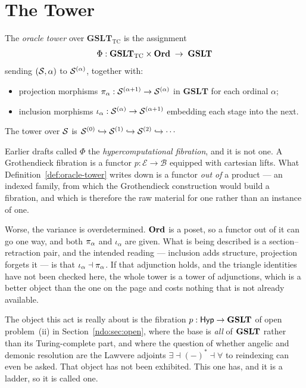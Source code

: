 \section{The Tower}

\begin{definition}
\label{def:oracle-tower}
The \emph{oracle tower} over $\mathbf{GSLT}_{\mathrm{TC}}$ is the
assignment
\[
  \Phi : \mathbf{GSLT}_{\mathrm{TC}} \times \mathbf{Ord} \;\to\; \mathbf{GSLT}
\]
sending $(\mathcal{S}, \alpha)$ to $\mathcal{S}^{(\alpha)}$, together with:
\begin{itemize}[itemsep=2pt]
  \item projection morphisms $\pi_{\alpha} : \mathcal{S}^{(\alpha+1)} \to \mathcal{S}^{(\alpha)}$
        in $\mathbf{GSLT}$ for each ordinal $\alpha$;
  \item inclusion morphisms $\iota_\alpha : \mathcal{S}^{(\alpha)} \to \mathcal{S}^{(\alpha+1)}$
        embedding each stage into the next.
\end{itemize}
The tower over $\mathcal{S}$ is
$\mathcal{S}^{(0)} \hookrightarrow \mathcal{S}^{(1)} \hookrightarrow \mathcal{S}^{(2)}
\hookrightarrow \cdots$
\end{definition}

\begin{remark}
\label{rmk:not-a-fibration}
Earlier drafts called $\Phi$ the \emph{hypercomputational fibration},
and it is not one.
A Grothendieck fibration is a functor $p : \mathcal{E} \to \mathcal{B}$
equipped with cartesian lifts.
What Definition~\ref{def:oracle-tower} writes down is a functor
\emph{out of} a product --- an indexed family, from which the
Grothendieck construction would build a fibration, and which is
therefore the raw material for one rather than an instance of one.

Worse, the variance is overdetermined.
$\mathbf{Ord}$ is a poset, so a functor out of it can go one way, and both
$\pi_{\alpha}$ and $\iota_\alpha$ are given.
What is being described is a section--retraction pair, and the
intended reading --- inclusion adds structure, projection forgets it
--- is that $\iota_\alpha \dashv \pi_{\alpha}$.
If that adjunction holds, and the triangle identities have not been
checked here, the whole tower is a tower of adjunctions, which is a
better object than the one on the page and costs nothing that is not
already available.

The object this act is really about is the fibration
$p : \mathsf{Hyp} \to \mathbf{GSLT}$ of open problem~(ii) in
Section~\ref{ndo:sec:open}, where the base is \emph{all} of
$\mathbf{GSLT}$ rather than its Turing-complete part, and where the
question of whether angelic and demonic resolution are the Lawvere
adjoints $\exists \dashv (-)^{\ast} \dashv \forall$ to reindexing can
even be asked.
That object has not been exhibited.
This one has, and it is a ladder, so it is called one.
\end{remark}

